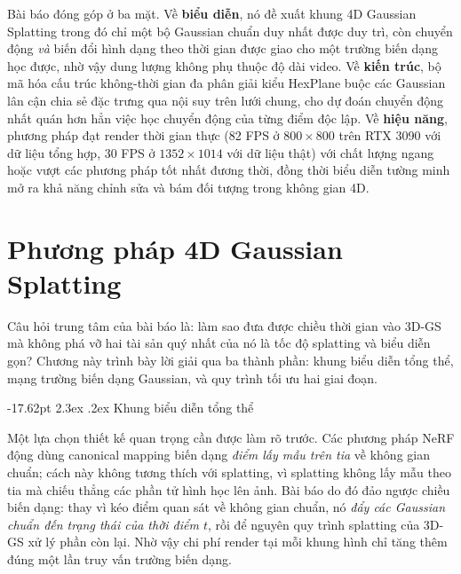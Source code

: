 \documentclass[a4paper]{report}
\makeatletter
\renewcommand\section{\@startsection{section}{1}{\z@}%
    {-17.62pt \@plus -5.89pt \@minus -1.18pt}%
    {2.3ex \@plus .2ex}%
    {\normalfont\fontsize{14.95pt}{16.31pt}\selectfont\bfseries}}
\makeatother
\begin{document}
Bài báo đóng góp ở ba mặt. Về \textbf{biểu diễn}, nó đề xuất khung 4D Gaussian
Splatting trong đó chỉ một bộ Gaussian chuẩn duy nhất được duy trì, còn chuyển
động \textit{và} biến đổi hình dạng theo thời gian được giao cho một trường biến
dạng học được, nhờ vậy dung lượng không phụ thuộc độ dài video. Về \textbf{kiến
trúc}, bộ mã hóa cấu trúc không-thời gian đa phân giải kiểu HexPlane buộc các
Gaussian lân cận chia sẻ đặc trưng qua nội suy trên lưới chung, cho dự đoán
chuyển động nhất quán hơn hẳn việc học chuyển động của từng điểm độc lập. Về
\textbf{hiệu năng}, phương pháp đạt render thời gian thực (82 FPS ở
$800\times800$ trên RTX 3090 với dữ liệu tổng hợp, 30 FPS ở $1352\times1014$ với
dữ liệu thật) với chất lượng ngang hoặc vượt các phương pháp tốt nhất đương thời,
đồng thời biểu diễn tường minh mở ra khả năng chỉnh sửa và bám đối tượng trong
không gian 4D.

\chapter{Phương pháp 4D Gaussian Splatting}
\label{chap:method}

Câu hỏi trung tâm của bài báo là: làm sao đưa được chiều thời gian vào 3D-GS mà
không phá vỡ hai tài sản quý nhất của nó là tốc độ splatting và biểu diễn gọn?
Chương này trình bày lời giải qua ba thành phần: khung biểu diễn tổng thể, mạng
trường biến dạng Gaussian, và quy trình tối ưu hai giai đoạn.

\section{Khung biểu diễn tổng thể}

Một lựa chọn thiết kế quan trọng cần được làm rõ trước. Các phương pháp NeRF động
dùng canonical mapping biến dạng \textit{điểm lấy mẫu trên tia} về không gian
chuẩn; cách này không tương thích với splatting, vì splatting không lấy mẫu theo
tia mà chiếu thẳng các phần tử hình học lên ảnh. Bài báo do đó đảo ngược chiều
biến dạng: thay vì kéo điểm quan sát về không gian chuẩn, nó \textit{đẩy các
Gaussian chuẩn đến trạng thái của thời điểm $t$}, rồi để nguyên quy trình
splatting của 3D-GS xử lý phần còn lại. Nhờ vậy chi phí render tại mỗi khung
hình chỉ tăng thêm đúng một lần truy vấn trường biến dạng.
\end{document}
